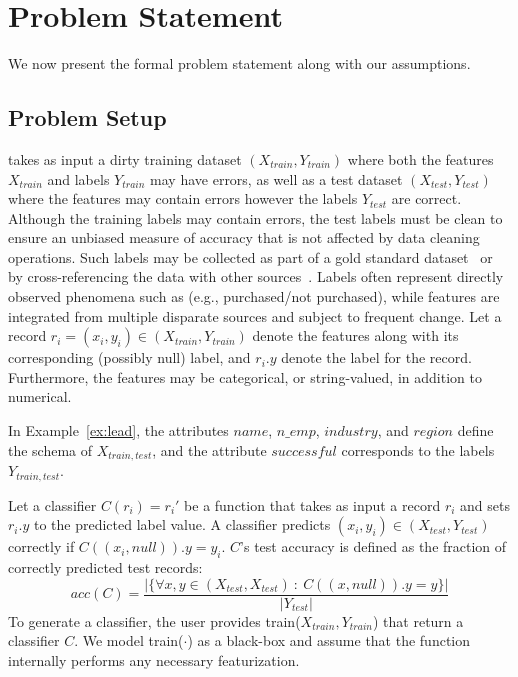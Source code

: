 
\section{Problem Statement}
We now present the formal problem statement along with our assumptions.

\subsection{Problem Setup}
\sys takes as input a dirty training dataset $(X_{train}, Y_{train})$ where both the features $X_{train}$ and labels $Y_{train}$ may have errors, as well as a test dataset $(X_{test}, Y_{test})$ where the features may contain errors however the labels $Y_{test}$ are correct.  Although the training labels may contain errors, the test labels must be clean to ensure an unbiased measure of accuracy that is not affected by data cleaning operations.  Such labels may be collected as part of a gold standard dataset~\cite{marcus2015crowdsourced} or by cross-referencing the data with other sources~\cite{li2012truth}.  
Labels often represent directly observed phenomena such as (e.g., purchased/not purchased), while features are integrated from multiple disparate sources and subject to frequent change.
Let a record $r_i = (x_i,y_i) \in (X_{train},Y_{train})$ denote the features along with its corresponding (possibly null) label, and $r_i.y$ denote the label for the record.    Furthermore, the features may be categorical, or string-valued, in addition to numerical.

\begin{example}[Notation]
In Example~\ref{ex:lead}, the attributes $name$, $n\_emp$, $industry$, and $region$ define the schema of $X_{train,test}$, and the attribute $successful$ corresponds to the labels $Y_{train,test}$.
\end{example}

Let a classifier $C(r_i) = r_i'$ be a function that takes as input a record $r_i$ and sets $r_i.y$ to the predicted label value.
A classifier predicts $(x_i, y_i) \in (X_{test}, Y_{test})$ correctly if  $C((x_i, null)).y = y_i$.  $C$'s test accuracy is defined as the fraction of correctly predicted test records:
\[
acc(C) = \frac{|\{\forall x,y \in (X_{test}, X_{test})~:~ C((x, null)).y = y\}|}{|Y_{test}|}
\]
To generate a classifier, the user provides \textsf{train}($X_{train}, Y_{train}$) that return a classifier $C$. We model \textsf{train}($\cdot$) as a black-box and assume that the function internally performs any necessary featurization.

